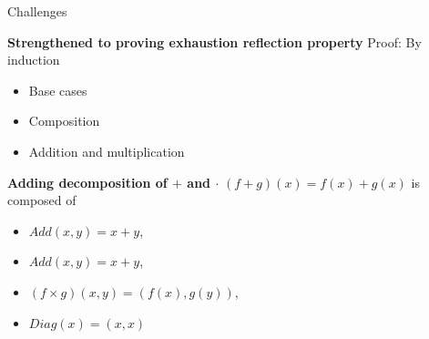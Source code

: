 \begin{frame}{Challenges}
\begin{minipage}[t]{0.44\linewidth}
\begin{exampleblock}{\textbf{\textcolor{BrickRed}{Strengthened to proving \textbf{exhaustion reflection property}}}}
            \pause
            Proof: By induction 
            \vspace{-0.5em}
            \begin{itemize}
                \setlength\itemsep{-5pt}
                \pause\item Base cases \Checkmark
                \pause\item Composition \Checkmark 
                \pause \item Addition and multiplication \textcolor{Mahogany}{\XSolidBrush}
            \end{itemize}
        \end{exampleblock}
        \vspace{-1em} \pause
        \begin{exampleblock}{\textbf{\textcolor{OliveGreen}{Adding decomposition of $+$ and $\cdot$}}}
        \vspace{-0.5em}
        $(f+g)(x) = f(x)+g(x)$ is composed of
        \vspace{-0.5em}
        \begin{itemize}
            \setlength\itemsep{-4pt}
            \item $\mathit{Add}(x,y) = x + y$,
            \item $\mathit{Add}(x,y) = x + y$,
            \item $(f\times g)(x,y) = (f(x),g(y))$, 
            \item $\mathit{Diag}(x) = (x,x) \qquad$ 
        \end{itemize}
        \end{exampleblock}
    \end{minipage}
    \note[itemize]{
}
\end{frame}
